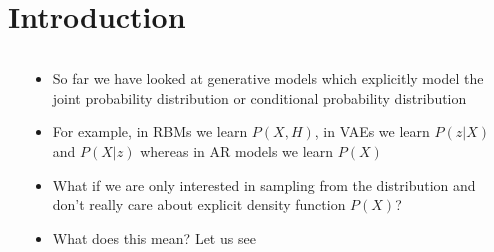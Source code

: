 \section{Introduction}



\begin{frame}
	\begin{columns}
		\begin{overlayarea}{\textwidth}{1\textheight}
		\vspace*{0mm}
			\begin{center}
			\\
			\onslide<1->{\vspace*{5mm} \scalebox{0.45}{}}
			\end{center}
		\end{overlayarea}

		\begin{overlayarea}{\textwidth}{\textheight}
			\begin{itemize}[<+->]
				\item<1-> So far we have looked at generative models which explicitly model the joint probability distribution or conditional probability distribution 
				\item<2-> For example, in RBMs we learn $P(X,H)$, in VAEs we learn $P(z|X)$ and $P(X|z)$ whereas in AR models we learn $P(X)$
     		\item<3-> What if we are only interested in sampling from the distribution and don't really care about explicit density function $P(X)$?
				\item<4-> What does this mean? \onslide<5->Let us see

			\end{itemize}
		\end{overlayarea}
	\end{columns}
\end{frame}



